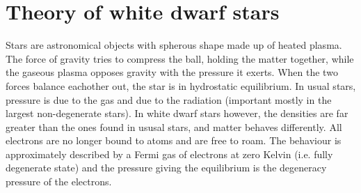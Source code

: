 \documentclass[]{article}
\begin{document}
\section{Theory of white dwarf stars}\label{sec:theroy-white-dwarfs}
	Stars are astronomical objects with spherous shape made up of heated plasma. The force of gravity tries to compress the ball, holding the matter together, while the gaseous plasma opposes gravity with the pressure it exerts. When the two forces balance eachother out, the star is in hydrostatic equilibrium. In usual stars, pressure is due to the gas and due to the radiation (important mostly in the largest non-degenerate stars). In white dwarf stars however, the densities are far greater than the ones found in ususal stars, and matter behaves differently. All electrons are no longer bound to atoms and are free to roam. The behaviour is approximately described by a Fermi gas of electrons at zero Kelvin (i.e. fully degenerate state) and the pressure giving the equilibrium is the degeneracy pressure of the electrons.
\end{document}

